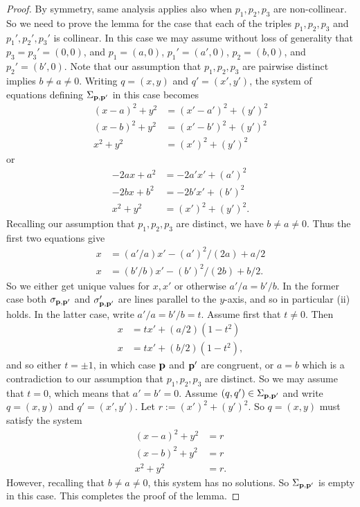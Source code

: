 \documentclass[10pt,a4paper]{amsart}
\newcommand{\p}{{\bf p}}
\begin{document}
\begin{proof}
By symmetry, same analysis applies also when $p_1,p_2,p_3$ are non-collinear. 
So we need to prove the lemma for the case that each of the triples $p_1,p_2,p_3$ and $p_1',p_2',p_3'$ is collinear. In this case we may assume without loss of generality that $p_3=p_3'=(0,0)$, and $p_1=(a,0)$, $p_1'=(a',0)$, $p_2=(b,0)$, and $p_2'=(b',0)$. Note that our assumption that $p_1,p_2,p_3$ are pairwise distinct implies $b\neq a\neq 0$. Writing $q=(x,y)$ and $q'=(x',y')$, the system of equations defining $\Sigma_{\p,\p'}$ in this case becomes
\begin{align*}
(x-a)^2+y^2&=(x'-a')^2+(y')^2\\
(x-b)^2+y^2&=(x'-b')^2+(y')^2\\
x^2+y^2&=(x')^2+(y')^2
\end{align*}
or
\begin{align*}
-2ax+a^2&=-2a'x'+(a')^2\\
-2bx+b^2&=-2b'x'+(b')^2\\
x^2+y^2&=(x')^2+(y')^2.
\end{align*}
Recalling our assumption that $p_1,p_2,p_3$ are distinct, we have $b\neq a\neq 0$. Thus the first two equations give 
\begin{align*}
x&=(a'/a)x'-(a')^2/(2a)+a/2\\
x&=(b'/b)x'-(b')^2/(2b)+b/2.
\end{align*}
So we either get unique values for $x,x'$ or otherwise $a'/a=b'/b$. In the former case both $\sigma_{\p,\p'}$ and $\sigma'_{\p,\p'}$  are lines parallel to the $y$-axis, and so in particular (ii) holds. 
In the latter case, write $a'/a=b'/b=t$. Assume first that $t\neq 0$. Then 
\begin{align*}
x&=tx'+(a/2)(1-t^2)\\
x&=tx'+(b/2)(1-t^2),
\end{align*}
and so either $t=\pm 1$, in which case $\p$ and $\p'$ are congruent, or $a=b$ which is a contradiction to our assumption that $p_1,p_2,p_3$ are distinct. 
So we may assume that $t=0$, which means that $a'=b'=0$. 
Assume $(q,q')\in \Sigma_{\p,\p'}$ and write $q=(x,y)$ and $q'=(x',y')$. 
Let $r:=(x')^2+(y')^2$. So $q=(x,y)$ must satisfy the system
\begin{align*}
(x-a)^2+y^2&=r\\
(x-b)^2+y^2&=r\\
x^2+y^2&=r.
\end{align*}
However, recalling that $b\neq a\neq 0$, this system has no solutions. So $\Sigma_{\p,\p'}$ is empty in this case. This completes the proof of the lemma. 
\end{proof}
\end{document}
